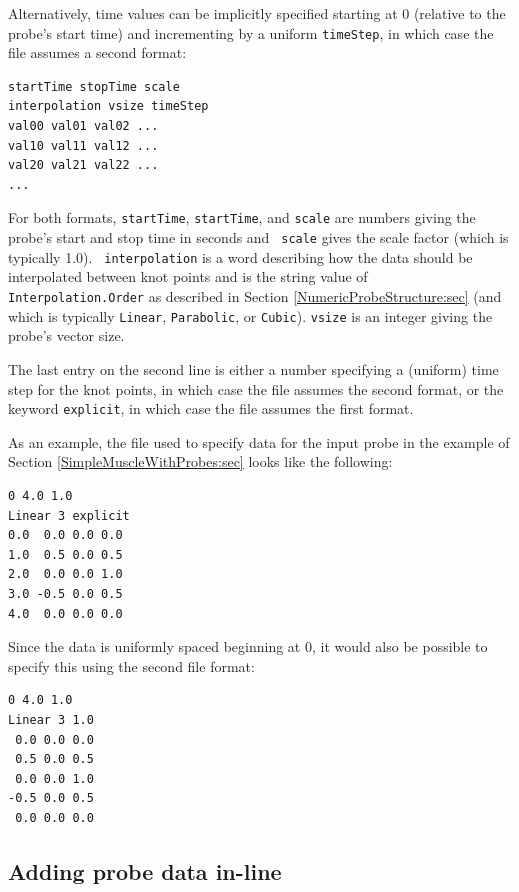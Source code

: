 Alternatively, time values can be implicitly specified starting at 0
(relative to the probe's start time) and incrementing by a uniform
{\tt timeStep}, in which case the file assumes a second format:
%
\begin{lstlisting}[]
startTime stopTime scale
interpolation vsize timeStep
val00 val01 val02 ...
val10 val11 val12 ...
val20 val21 val22 ...
...
\end{lstlisting}
%
For both formats, {\tt startTime}, {\tt startTime}, and {\tt scale}
are numbers giving the probe's start and stop time in seconds and {\tt
scale} gives the scale factor (which is typically 1.0).  {\tt
interpolation} is a word describing how the data should be
interpolated between knot points and is the string value of {\tt
Interpolation.Order} as described in Section
\ref{NumericProbeStructure:sec} (and which is typically {\tt Linear},
{\tt Parabolic}, or {\tt Cubic}). {\tt vsize} is an integer giving the
probe's vector size.

The last entry on the second line is either a number specifying a
(uniform) time step for the knot points, in which case the file
assumes the second format, or the keyword {\tt explicit}, in which
case the file assumes the first format.

As an example, the file used to specify data for the input probe in
the example of Section \ref{SimpleMuscleWithProbes:sec} looks like
the following:
%
\begin{lstlisting}[]
0 4.0 1.0
Linear 3 explicit
0.0  0.0 0.0 0.0 
1.0  0.5 0.0 0.5
2.0  0.0 0.0 1.0
3.0 -0.5 0.0 0.5
4.0  0.0 0.0 0.0
\end{lstlisting}
%
Since the data is uniformly spaced beginning at 0, it would also be
possible to specify this using the second file format:
%
\begin{lstlisting}[]
0 4.0 1.0
Linear 3 1.0
 0.0 0.0 0.0 
 0.5 0.0 0.5
 0.0 0.0 1.0
-0.5 0.0 0.5
 0.0 0.0 0.0
\end{lstlisting}
%

\subsection{Adding probe data in-line}

